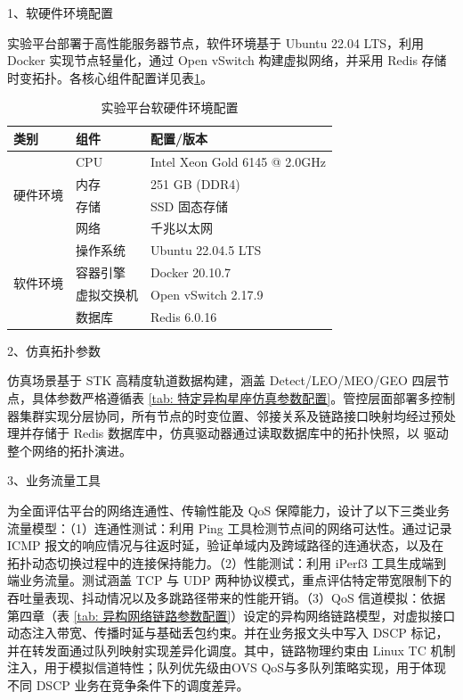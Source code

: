 \documentclass[print, master, vlined]{DissertUESTC}
\begin{document}
    1、软硬件环境配置
    
    实验平台部署于高性能服务器节点，软件环境基于 Ubuntu 22.04 LTS，利用 Docker 实现节点轻量化，通过 Open vSwitch 构建虚拟网络，并采用 Redis 存储时变拓扑。各核心组件配置详见表\ref{tab: 实验平台软硬件环境配置}。
    \begin{table}[!htb]
        \centering
        \caption{实验平台软硬件环境配置}
        \label{tab: 实验平台软硬件环境配置}
        \begin{threeparttable}
            \begin{tabular}{lll}
                \toprule
                \textbf{类别} & \textbf{组件} & \textbf{配置/版本} \\
                \midrule
                \multirow{4}{*}{硬件环境} & CPU & Intel Xeon Gold 6145 @ 2.0GHz \\
                                         & 内存 & 251 GB (DDR4) \\
                                         & 存储 & SSD 固态存储 \\
                                         & 网络 & 千兆以太网 \\
                \midrule
                \multirow{4}{*}{软件环境} & 操作系统 & Ubuntu 22.04.5 LTS \\
                                         & 容器引擎 & Docker 20.10.7 \\
                                         & 虚拟交换机 & Open vSwitch 2.17.9 \\
                                         & 数据库 & Redis 6.0.16 \\
                \bottomrule
            \end{tabular}
        \end{threeparttable}
    \end{table}

    2、仿真拓扑参数
    
    仿真场景基于 STK 高精度轨道数据构建，涵盖 Detect/LEO/MEO/GEO 四层节点，具体参数严格遵循表 \ref{tab: 特定异构星座仿真参数配置}。管控层面部署多控制器集群实现分层协同，所有节点的时变位置、邻接关系及链路接口映射均经过预处理并存储于 Redis 数据库中，仿真驱动器通过读取数据库中的拓扑快照，以 驱动整个网络的拓扑演进。
    

    3、业务流量工具
    
    为全面评估平台的网络连通性、传输性能及 QoS 保障能力，设计了以下三类业务流量模型：（1）连通性测试：利用 Ping 工具检测节点间的网络可达性。通过记录 ICMP 报文的响应情况与往返时延，验证单域内及跨域路径的连通状态，以及在拓扑动态切换过程中的连接保持能力。（2）性能测试：利用 iPerf3 工具生成端到端业务流量。测试涵盖 TCP 与 UDP 两种协议模式，重点评估特定带宽限制下的吞吐量表现、抖动情况以及多跳路径带来的性能开销。（3）QoS 信道模拟：依据第四章（表 \ref{tab: 异构网络链路参数配置}）设定的异构网络链路模型，对虚拟接口动态注入带宽、传播时延与基础丢包约束。并在业务报文头中写入 DSCP 标记，并在转发面通过队列映射实现差异化调度。其中，链路物理约束由 Linux TC 机制注入，用于模拟信道特性；队列优先级由OVS QoS与多队列策略实现，用于体现不同 DSCP 业务在竞争条件下的调度差异。
    
\end{document}
